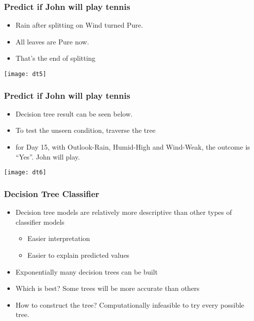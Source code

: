 \begin{frame}[fragile]\frametitle{Predict if John will play tennis}

	\begin{itemize}
	\item Rain after splitting on Wind turned Pure.
	\item All leaves are Pure now.
	\item That's the end of splitting
	\end{itemize}
\begin{center}
\texttt{[image: dt5]}
\end{center}
\end{frame}

\begin{frame}[fragile]\frametitle{Predict if John will play tennis}

	\begin{itemize}
	\item Decision tree result can be seen below.
	\item To test the unseen condition, traverse the tree
	\item for Day 15, with Outlook-Rain, Humid-High and Wind-Weak, the outcome is ``Yes''.  John will play.
	\end{itemize}
\begin{center}
\texttt{[image: dt6]}
\end{center}
\end{frame}


\begin{frame}[fragile]\frametitle{Decision Tree Classifier}
\begin{itemize}
\item Decision tree models are relatively more descriptive than other types of classifier models
\begin{itemize}
\item Easier interpretation
\item Easier to explain predicted values
\end{itemize}
\item Exponentially many decision trees can be built
\item Which is best? Some trees will be more accurate than others
\item How to construct the tree? Computationally infeasible to try every possible tree.
\end{itemize}
\end{frame}

